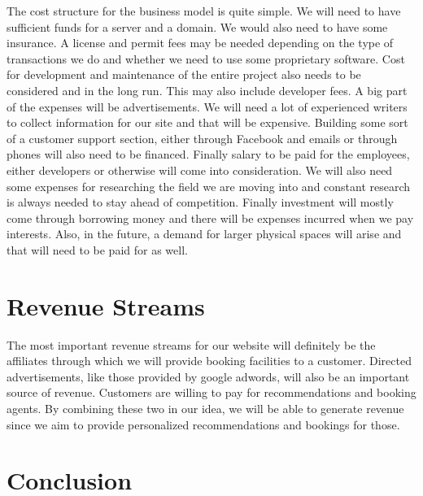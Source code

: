 \documentclass[IN,english]{tumbook}
\begin{document}
The cost structure for the business model is quite simple. We will need to have sufficient funds for a server and a domain. We would also need to have some insurance. A license and permit fees may be needed depending on the type of transactions we do and whether we need to use some proprietary software. Cost for development and maintenance of the entire project also needs to be considered and in the long run. This may also include developer fees. A big part of the expenses will be advertisements. We will need a lot of experienced writers to collect information for our site and that will be expensive. Building some sort of a customer support section, either through Facebook and emails or through phones will also need to be financed. Finally salary to be paid for the employees, either developers or otherwise will come into consideration. We will also need some expenses for researching the field we are moving into and constant research is always needed to stay ahead of competition. Finally investment will mostly come through borrowing money and there will be expenses incurred when we pay interests. Also, in the future, a demand for larger physical spaces will arise and that will need to be paid for as well.

\section{Revenue Streams}

The most important revenue streams for our website will definitely be the affiliates through which we will provide booking facilities to a customer. Directed advertisements, like those provided by google adwords, will also be an important source of revenue. Customers are willing to pay for recommendations and booking agents. By combining these two in our idea, we will be able to generate revenue since we aim to provide personalized recommendations and bookings for those.

\section{Conclusion}
\end{document}
